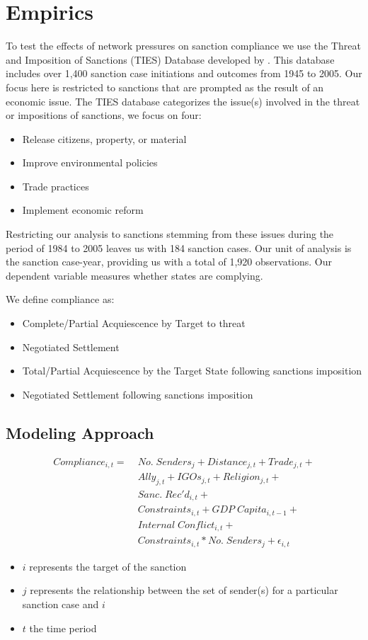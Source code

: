 \section*{Empirics}
\label{empirics}

To test the effects of network pressures on sanction compliance we use the Threat and Imposition of Sanctions (TIES) Database developed by \citet{morgan2009threat}. This database includes over 1,400 sanction case initiations and outcomes from 1945 to 2005. Our focus here is restricted to sanctions that are prompted as the result of an economic issue. The TIES database categorizes the issue(s) involved in the threat or impositions of sanctions, we focus on four:

\begin{itemize}
	\item Release citizens, property, or material
	\item Improve environmental policies
	\item Trade practices
	\item Implement economic reform
\end{itemize}

Restricting our analysis to sanctions stemming from these issues during the period of 1984 to 2005 leaves us with 184 sanction cases. Our unit of analysis is the sanction case-year, providing us with a total of 1,920 observations. Our dependent variable measures whether states are complying. 


We define compliance as:
	\begin{itemize}
		\item Complete/Partial Acquiescence by Target to threat
		\item Negotiated Settlement
		\item Total/Partial Acquiescence by the Target State following sanctions imposition
		\item Negotiated Settlement following sanctions imposition
	\end{itemize}
	
\subsection{Modeling Approach} 
\begin{align*}
		Compliance_{i,t} =\; & No. \; Senders_{j} + Distance_{j,t} + Trade_{j,t}  + \\
		 &Ally_{j,t} + IGOs_{j,t} + Religion_{j,t} +\\
 		 &Sanc. \; Rec'd_{i,t} + \\
		 &Constraints_{i,t} + GDP \; Capita_{i,t-1} +\\
		 & Internal \; Conflict_{i,t} +\\
		 &Constraints_{i,t}*No. \; Senders_{j} + \epsilon_{i,t}
	\end{align*}
	
\begin{itemize}
	\item $i$ represents the target of the sanction
	\item $j$ represents the relationship between the set of sender(s) for a particular sanction case and $i$
	\item $t$ the time period
\end{itemize}
